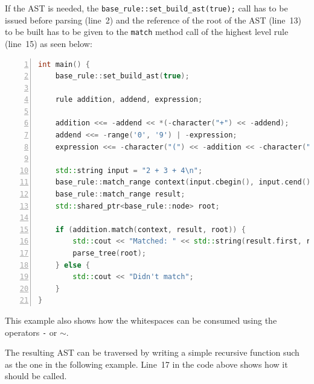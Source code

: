 \documentclass[12pt]{article}
\begin{document}
If the AST is needed, the \texttt{base\_rule::set\_build\_ast(true);} call has to be issued before parsing
(line~2) and the reference of the root of the AST (line~13) to be built has to be given to the \texttt{match}
method call of the highest level rule (line~15) as seen below:

\begin{center}
	\begin{minipage}[h]{0.85\textwidth}
		\begin{lstlisting}[language=C++, breaklines=true, numbers=left]
int main() {
	base_rule::set_build_ast(true);

	rule addition, addend, expression;

	addition <<= -addend << *(-character("+") << -addend);
	addend <<= -range('0', '9') | -expression;
	expression <<= -character("(") << -addition << -character(")");

	std::string input = "2 + 3 + 4\n";
	base_rule::match_range context(input.cbegin(), input.cend());
	base_rule::match_range result;
	std::shared_ptr<base_rule::node> root;

	if (addition.match(context, result, root)) {
		std::cout << "Matched: " << std::string(result.first, result.second);
		parse_tree(root);
	} else {
		std::cout << "Didn't match";
	}
}
		\end{lstlisting}
	\end{minipage}
\end{center}

This example also shows how the whitespaces can be consumed using the operators \texttt{-} or \texttt{$\sim$}.

The resulting AST can be traversed by writing a simple recursive function such as the one in the following
example. Line~17 in the code above shows how it should be called.
\end{document}
